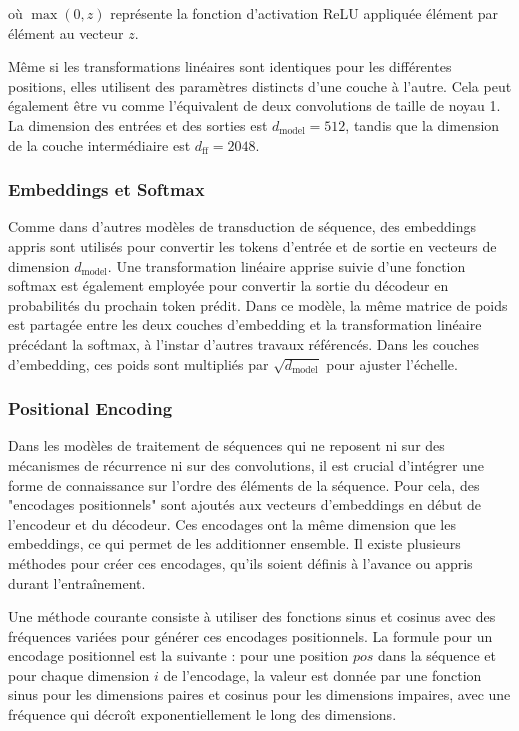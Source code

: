 où \( \max(0, z) \) représente la fonction d'activation ReLU appliquée élément par élément au vecteur \( z \).

Même si les transformations linéaires sont identiques pour les différentes positions, elles utilisent des paramètres distincts d'une couche à l'autre. Cela peut également être vu comme l'équivalent de deux convolutions de taille de noyau 1. La dimension des entrées et des sorties est \( d_{\text{model}} = 512 \), tandis que la dimension de la couche intermédiaire est \( d_{\text{ff}} = 2048 \).

\subsubsection{Embeddings et Softmax}
Comme dans d'autres modèles de transduction de séquence, des embeddings appris sont utilisés pour convertir les tokens d'entrée et de sortie en vecteurs de dimension \(d_{\text{model}}\). Une transformation linéaire apprise suivie d'une fonction softmax est également employée pour convertir la sortie du décodeur en probabilités du prochain token prédit. Dans ce modèle, la même matrice de poids est partagée entre les deux couches d'embedding et la transformation linéaire précédant la softmax, à l'instar d'autres travaux référencés. Dans les couches d'embedding, ces poids sont multipliés par \(\sqrt{d_{\text{model}}}\) pour ajuster l'échelle.

\subsubsection{Positional Encoding}
Dans les modèles de traitement de séquences qui ne reposent ni sur des mécanismes de récurrence ni sur des convolutions, il est crucial d'intégrer une forme de connaissance sur l'ordre des éléments de la séquence. Pour cela, des "encodages positionnels" sont ajoutés aux vecteurs d'embeddings en début de l'encodeur et du décodeur. Ces encodages ont la même dimension que les embeddings, ce qui permet de les additionner ensemble. Il existe plusieurs méthodes pour créer ces encodages, qu'ils soient définis à l'avance ou appris durant l'entraînement.

Une méthode courante consiste à utiliser des fonctions sinus et cosinus avec des fréquences variées pour générer ces encodages positionnels. La formule pour un encodage positionnel est la suivante : pour une position \(pos\) dans la séquence et pour chaque dimension \(i\) de l'encodage, la valeur est donnée par une fonction sinus pour les dimensions paires et cosinus pour les dimensions impaires, avec une fréquence qui décroît exponentiellement le long des dimensions.

